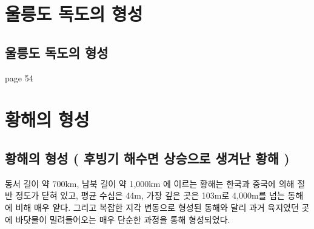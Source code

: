 \documentclass[12pt,a4paper]{book}
\newcommand{\SectionMargin}			{\newpage  \null \vskip 0cm}
\begin{document}
\newpage
\chapter{울릉도 독도의 형성}



	\SectionMargin
	\section{울릉도 독도의 형성}
	\null

page 54


\newpage
\chapter{황해의 형성}



	\SectionMargin
	\section{황해의 형성 ( 후빙기 해수면 상승으로 생겨난 황해 )}
	\null



동서 길이 약 700km, 남북 길이 약 1,000km 에 이르는 황해는 한국과 중국에 의해 절반 정도가 닫혀 있고, 평균 수심은 44m, 가장 깊은 곳은 103m로 4,000m를 넘는 동해에 비해 매우 얕다. 그리고 복잡한 지각 변동으로 형성된 동해와 달리 과거 육지였던 곳에 바닷물이 밀려들어오는 매우 단순한 과정을 통해 형성되었다. \\
\end{document}
